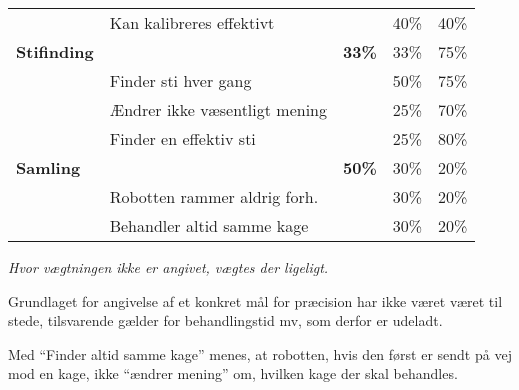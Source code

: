 \begin{footnotesize}
\begin{center}
\begin{tabular}{l | l | r r r}
	& Kan kalibreres effektivt & & 40\% & 40\% \\
	\hspace*{0.3cm}\hspace*{0.3cm} \textbf{Stifinding}
																&		&	\textbf{33\%} & 	33\% & 75\% \\
	& Finder sti hver gang & & 50\% & 75\% \\
	& Ændrer ikke væsentligt mening & & 25\% & 70\% \\
	& Finder en effektiv sti & & 25\% & 80\% \\
	\hspace*{0.3cm} \textbf{Samling}
																&		&\textbf{50\%}		& 	30\%	& 20\% \\
	& Robotten rammer aldrig forh. & & 30\% & 20\% \\
	& Behandler altid samme kage & & 30\% & 20\%
\end{tabular}
\end{center}
\end{footnotesize}
\textit{Hvor vægtningen ikke er angivet, vægtes der ligeligt.}

Grundlaget for angivelse af et konkret mål for præcision har ikke været  været til stede, tilsvarende gælder for behandlingstid mv, som derfor er udeladt.

Med "`Finder altid samme kage"' menes, at robotten, hvis den først er sendt på vej mod en kage, ikke "`ændrer mening"' om, hvilken kage der skal behandles.